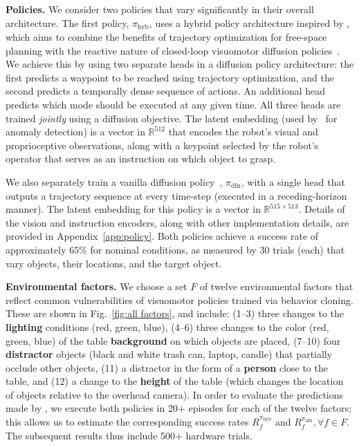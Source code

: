 {\bf Policies.} We consider two policies that vary significantly in their overall architecture. The first policy, $\pi_\text{hyb}$, uses a hybrid policy architecture inspired by \cite{belkhale2023hydra}, which aims to combine the benefits of trajectory optimization for free-space planning with the reactive nature of closed-loop visuomotor diffusion policies~\cite{chi2023diffusion}. We achieve this by using two separate heads in a diffusion policy architecture: the first predicts a waypoint to be reached using trajectory optimization, and the second predicts a temporally dense sequence of actions. An additional head predicts which mode should be executed at any given time. All three heads are trained \emph{jointly} using a diffusion objective. The latent embedding (used by \redit~for anomaly detection) is a vector in $\mathbb{R}^{512}$ that encodes the robot's visual and proprioceptive observations, along with a keypoint selected by the robot's operator that serves as an instruction on which object to grasp. 


We also separately train a vanilla diffusion policy~\cite{chi2023diffusion}, $\pi_\text{dfn}$, with a single head that outputs a trajectory sequence at every time-step (executed in a receding-horizon manner). The latent embedding for this policy is a vector in $\mathbb{R}^{515 \times 513}$. Details of the vision and instruction encoders, along with other implementation details, are provided in Appendix~\ref{app:policy}. Both policies achieve a success rate of approximately $65\%$ for nominal conditions, as measured by 30 trials (each) that vary objects, their locations, and the target object. 

{\bf Environmental factors.} We choose a set $F$ of twelve environmental factors that reflect common vulnerabilities of visuomotor policies trained via behavior cloning. These are shown in Fig.~\ref{fig:all factors}, and include: (1--3) three changes to the {\bf lighting} conditions (red, green, blue), (4--6) three changes to the color (red, green, blue) of the table {\bf background} on which objects are placed, (7--10) four {\bf distractor} objects (black and white trash can, laptop, candle) that partially occlude other objects, (11) a distractor in the form of a {\bf person} close to the table, and (12) a change to the {\bf height} of the table (which changes the location of objects relative to the overhead camera). In order to evaluate the predictions made by \redit, we execute both policies in 20+ episodes for each of the twelve factors; this allows us to estimate the corresponding success rates $R^{\pi_\text{hyb}}_f$ and $R^{\pi_\text{dfn}}_f, \forall f \in F$. The subsequent results thus include 500+ hardware trials. 

